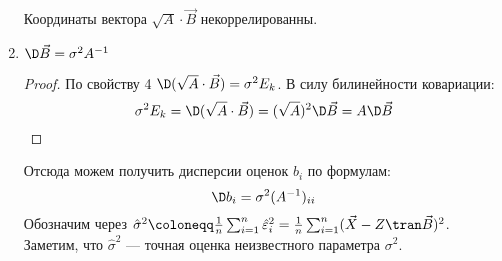 \begin{prop}
\begin{enumerate}
              \begin{corollary}
                  Координаты вектора \(\sqrt{A} \cdot \vec{B}\) некоррелированны.
              \end{corollary}
        \item \(\D \vec{B} = \sigma^2 A^{-1}\)\label{prop:ОМНК5}
              \begin{proof}
                  По свойству 4 \(\D(\sqrt{A} \cdot \vec{B}) = \sigma^2 E_k\). В силу билинейности ковариации:
                  \[\sigma^2 E_k = \D(\sqrt{A} \cdot \vec{B}) = (\sqrt{A})^2 \D \vec{B} = A \D \vec{B}\]
              \end{proof}

              Отсюда можем получить дисперсии оценок \(b_i\) по формулам:
              \[\D b_i = \sigma^2 (A^{-1})_{ii}\]
              Обозначим через \(\hat{\sigma}^2 \coloneqq \frac{1}{n} \sum_{i=1}^{n} \hat{\varepsilon}_i^2 = \frac{1}{n} \sum_{i=1}^{n} (\vec{X} - Z\tran \vec{B})^2\). Заметим, что \(\hat{\sigma}^2\) --- точная оценка неизвестного параметра \(\sigma^2\).
    \end{enumerate}
\end{prop}

